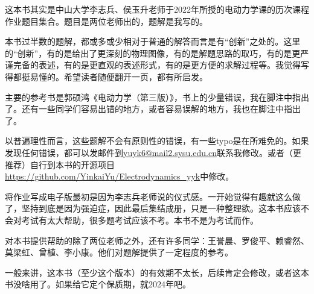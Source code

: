 \thispagestyle{plain}
\vspace*{\fill}
    \begin{center}
        \begin{minipage}{0.75\textwidth}
            \begin{spacing}{1.5}
            
                \suojin
                这本书其实是中山大学李志兵、侯玉升老师于2022年所授的电动力学课的历次课程作业题目集合。题目是两位老师出的，题解是我写的。
                
                \suojin
                本书过半数的题解，都或多或少相对于普通的解答而言是有“创新”之处的。这里的“创新”，有的是给出了更深刻的物理图像，有的是解题思路的取巧，有的是更严谨完备的表述，有的是更直观的表述形式，有的是更方便的求解过程等。我觉得写得都挺易懂的。希望读者随便翻开一页，都有所启发。
                
                \suojin
                主要的参考书是郭硕鸿《电动力学（第三版）》，书上的少量错误，我在脚注中指出了。还有一些同学们容易出错的地方，或者容易误解的地方，我也在脚注中指出了。
                
                \suojin
                以普遍理性而言，这些题解不会有原则性的错误，有一些typo是在所难免的。如果发现任何错误，都可以发邮件到\url{yuyk6@mail2.sysu.edu.cn}联系我修改。或者（更推荐）自行到本书的开源项目\url{https://github.com/YinkaiYu/Electrodynamics_yyk}中修改。
                
                \suojin
                将作业写成电子版最初是因为李志兵老师说的仪式感。一开始觉得有趣就这么做了，坚持到底是因为强迫症，因此最后集结成册，只是一种整理欲。这本书应该不会对考试有太大帮助，很多题考试应该不考。本书不是为考试而作。
                
                \suojin
                对本书提供帮助的除了两位老师之外，还有许多同学：王誉晨、罗俊平、赖睿然、莫梁虹、曾植、李小康。他们对题解提供了一定程度的参考。
                
                \suojin
                一般来讲，这本书（至少这个版本）的有效期不太长，后续肯定会修改，或者这本书没啥用了。如果给它定个保质期，就2024年吧。
                
                \suojin
        
            \end{spacing}
        \end{minipage}
    \end{center}
\vspace*{\fill}
